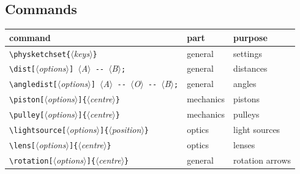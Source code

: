 \documentclass[a4paper,11pt]{article}
\newcommand\cs[1]{\texttt{\textbackslash#1}}
\newcommand\marg[1]{\texttt{\{}\meta{#1}\texttt{\}}}
\newcommand\oarg[1]{\texttt{[}\meta{#1}\texttt{]}}
\newcommand\meta[1]{\ensuremath{\langle}\textit{#1}\ensuremath{\rangle}}
\begin{document}
\subsection{Commands}
\begin{center}\small
\begin{tabular}{lll}
  \toprule
  command & part & purpose \\
  \midrule
  \cs{physketchset}\marg{keys} & general & settings \\
  \verb|\dist[|\meta{options}\verb|] |\meta{A}\verb| -- |\meta{B}\verb|;| & general & distances \\
  \verb|\angledist[|\meta{options}\verb|] |\meta{A}\verb| -- |\meta{O}\verb| -- |\meta{B}\verb|;| & general & angles \\
  \cs{piston}\oarg{options}\marg{centre} & mechanics & pistons \\
  \cs{pulley}\oarg{options}\marg{centre} & mechanics & pulleys \\
  \cs{lightsource}\oarg{options}\marg{position} & optics & light sources \\
  \cs{lens}\oarg{options}\marg{centre} & optics & lenses \\
  \cs{rotation}\oarg{options}\marg{centre} & general & rotation arrows \\
  \bottomrule
\end{tabular}
\end{center}
\end{document}
